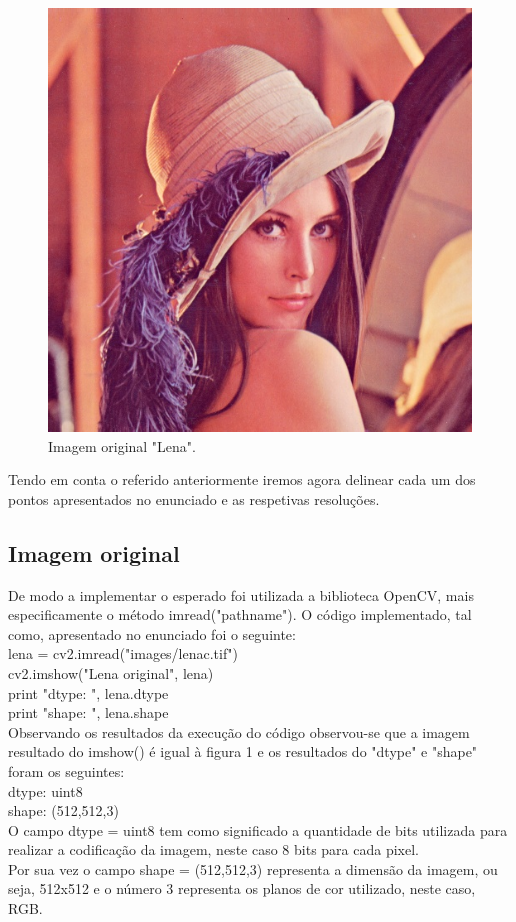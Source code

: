 \documentclass[12pt,a4paper]{article}
\begin{document}
\begin{figure}[h]
\includegraphics[scale=0.5]{lenacc}
\centering
\caption{Imagem original "Lena".}
\end{figure}

Tendo em conta o referido anteriormente iremos agora delinear cada um dos pontos apresentados no enunciado e as respetivas resoluções.

\clearpage

\subsection{Imagem original}
De modo a implementar o esperado foi utilizada a biblioteca OpenCV, mais especificamente o método imread("pathname"). O código implementado, tal como, apresentado no enunciado foi o seguinte:\\
\newline
lena = cv2.imread("images/lenac.tif")\\
cv2.imshow("Lena original", lena)\\
print "dtype: ", lena.dtype\\
print "shape: ", lena.shape\\
\newline
Observando os resultados da execução do código observou-se que a imagem resultado do imshow() é igual à figura 1 e os resultados do "dtype" e "shape" foram os seguintes:\\
\newline
dtype: uint8\\
shape: (512,512,3)\\
\newline
O campo dtype = uint8 tem como significado a quantidade de bits utilizada para realizar a codificação da imagem, neste caso 8 bits para cada pixel.\\
Por sua vez o campo shape = (512,512,3) representa a dimensão da imagem, ou seja, 512x512 e o número 3 representa os planos de cor utilizado, neste caso, RGB.
\end{document}
